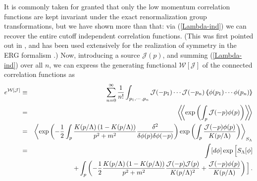 \documentclass[aps,prd,preprint,groupedaddress,preprintnumbers,longbibliography]{revtex4-1}
\newcommand{\nn}{\nonumber}
\newcommand{\SL}{S_\Lambda}
\newcommand{\WW}{\mathcal{W}}
\newcommand{\JJ}{\mathcal{J}}
\newcommand{\vev}[1]{\left\langle #1 \right\rangle}
\newcommand{\vvev}[1]{\vev{\kern-0.3em\left\langle #1
    \right\rangle\kern-0.3em}}
\begin{document}
It is commonly taken for granted that only the low momentum
correlation functions are kept invariant under the exact
renormalization group transformations, but we have shown more than
that: via (\ref{Lambda-ind}) we can recover the entire cutoff
independent correlation functions. (This was first pointed out in
\cite{Sonoda:2007dj}, and has been used extensively for the
realization of symmetry in the ERG formalism \cite{Igarashi:2009tj}.)
Now, introducing a source $\JJ (p)$, and summing (\ref{Lambda-ind})
over all $n$, we can express the generating functional $\WW [\JJ]$ of
the connected correlation functions as
\begin{eqnarray}
e^{\WW [\JJ]} &\equiv& \sum_{n=0}^\infty \frac{1}{n!} \int_{p_1,
                       \cdots, p_n} \JJ (-p_1) \cdots \JJ (-p_n)
                       \vvev{\phi (p_1) \cdots \phi (p_n)}\nn\\
&=& \vvev{\exp \left( \int_p \JJ (-p) \phi (p) \right)} \nn\\
&=& \vev{\exp \left( - \frac{1}{2} \int_p
    \frac{K(p/\Lambda)\left(1-K(p/\Lambda)\right)}{p^2+m^2}
\frac{\delta^2}{\delta \phi (p) \delta \phi (-p)}\right)
    \exp \left( \int_p \frac{\JJ (-p) \phi
    (p)}{K(p/\Lambda)}\right)}_{\SL}\nn\\
&=& \int [d\phi] \exp \Big[ \SL [\phi] \nn\\
&&\quad + \int_p \left( - \frac{1}{2} 
 \frac{K(p/\Lambda)\left(1-K(p/\Lambda)\right)}{p^2+m^2} \frac{\JJ
    (-p) \JJ (p)}{K(p/\Lambda)^2} + \frac{\JJ (-p) \phi
    (p)}{K(p/\Lambda)} \right) \Big]\,. \label{WW-def}
\end{eqnarray}
\end{document}
